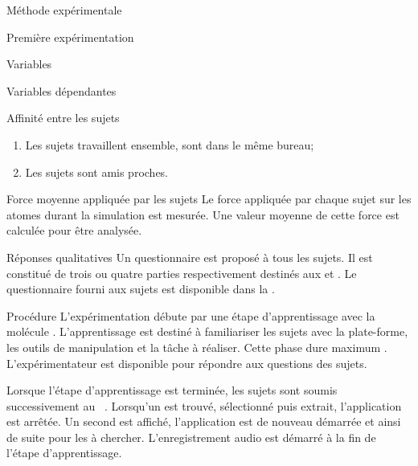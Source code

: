 \documentclass[myfrancais]{mythesis}
\begin{document}
\begin{mychapter}{Méthode expérimentale}
\begin{mysection}{Première expérimentation}
\begin{mysubsection}{Variables}
\begin{mysubsubsection}{Variables dépendantes}
\begin{myparagraph}{ Affinité entre les sujets}
\begin{enumerate}
							\item Les sujets travaillent ensemble, sont dans le même bureau;
							\item Les sujets sont amis proches.
						\end{enumerate}
					\end{myparagraph}
					\begin{myparagraph}{ Force moyenne appliquée par les sujets}
						Le force appliquée par chaque sujet sur les atomes durant la simulation est mesurée.
						Une valeur moyenne de cette force est calculée pour être analysée.
					\end{myparagraph}
					\begin{myparagraph}{ Réponses qualitatives}
						Un questionnaire est proposé à tous les sujets.
						Il est constitué de trois ou quatre parties respectivement destinés aux  et .
						Le questionnaire fourni aux sujets est disponible dans la .
					\end{myparagraph}
				\end{mysubsubsection}
			\end{mysubsection}
			\begin{mysubsection}{Procédure}
				L'expérimentation débute par une étape d'apprentissage avec la molécule \myTRPZIPPER.
				L'apprentissage est destiné à familiariser les sujets avec la plate-forme, les outils de manipulation et la tâche à réaliser.
				Cette phase dure maximum .
				L'expérimentateur est disponible pour répondre aux questions des sujets.

				Lorsque l'étape d'apprentissage est terminée, les sujets sont soumis successivement au ~.
				Lorsqu'un  est trouvé, sélectionné puis extrait, l'application est arrêtée.
				Un second  est affiché, l'application est de nouveau démarrée et ainsi de suite pour les  à chercher.
				L'enregistrement audio est démarré à la fin de l'étape d'apprentissage.


\end{mysubsection}
\end{mysection}
\end{mychapter}
\end{document}
